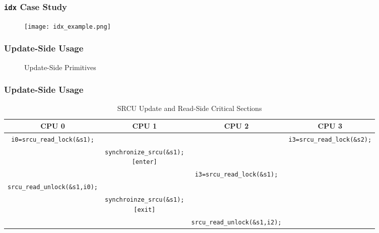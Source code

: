\documentclass{beamer}
\begin{document}

\begin{frame}[t]
  \frametitle{\texttt{idx} Case Study}

  \begin{figure}[ht]
    \centering
    \texttt{[image: idx\_example.png]}
  \end{figure}
  
\end{frame}


\begin{frame}[t]
  \frametitle{Update-Side Usage}

  \begin{figure}
    
    \caption{Update-Side Primitives}
  \end{figure}
  
\end{frame}


\begin{frame}[t]
  \frametitle{Update-Side Usage}

  \begin{table}
    {\tiny
    \begin{tabular}{c | c | c | c}
      CPU 0 & CPU 1 & CPU 2 & CPU 3\\
      \midrule
      \texttt{i0=srcu\_read\_lock(\&s1);} & & & \texttt{i3=srcu\_read\_lock(\&s2);}\\
      \midrule
      & \makecell{\texttt{synchronize\_srcu(\&s1);} \\ \texttt{[enter]}} & & \\
      \midrule
       & & \texttt{i3=srcu\_read\_lock(\&s1);} & \\
      \midrule
      \texttt{srcu\_read\_unlock(\&s1,i0);} & & & \\
      \midrule
       & \makecell{\texttt{synchroinze\_srcu(\&s1);} \\ \texttt{[exit]}} & & \\
      \midrule
       & & \texttt{srcu\_read\_unlock(\&s1,i2);} & 
    \end{tabular}
    }
    \caption{SRCU Update and Read-Side Critical Sections}
  \end{table}
  
\end{frame}
\end{document}
